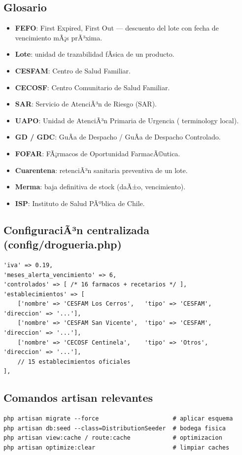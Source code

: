 ﻿\documentclass[a4paper, 12pt]{article}
\begin{document}
\subsection{Glosario}
\begin{itemize}
    \item \textbf{FEFO}: First Expired, First Out --- descuento del lote con fecha de vencimiento mÃ¡s prÃ³xima.
    \item \textbf{Lote}: unidad de trazabilidad fÃ­sica de un producto.
    \item \textbf{CESFAM}: Centro de Salud Familiar.
    \item \textbf{CECOSF}: Centro Comunitario de Salud Familiar.
    \item \textbf{SAR}: Servicio de AtenciÃ³n de Riesgo (SAR).
    \item \textbf{UAPO}: Unidad de AtenciÃ³n Primaria de Urgencia ( terminology local).
    \item \textbf{GD / GDC}: GuÃ­a de Despacho / GuÃ­a de Despacho Controlado.
    \item \textbf{FOFAR}: FÃ¡rmacos de Oportunidad FarmacÃ©utica.
    \item \textbf{Cuarentena}: retenciÃ³n sanitaria preventiva de un lote.
    \item \textbf{Merma}: baja definitiva de stock (daÃ±o, vencimiento).
    \item \textbf{ISP}: Instituto de Salud PÃºblica de Chile.
\end{itemize}

\subsection{ConfiguraciÃ³n centralizada (config/drogueria.php)}
\begin{lstlisting}
'iva' => 0.19,
'meses_alerta_vencimiento' => 6,
'controlados' => [ /* 16 farmacos + recetarios */ ],
'establecimientos' => [
    ['nombre' => 'CESFAM Los Cerros',   'tipo' => 'CESFAM', 'direccion' => '...'],
    ['nombre' => 'CESFAM San Vicente',  'tipo' => 'CESFAM', 'direccion' => '...'],
    ['nombre' => 'CECOSF Centinela',    'tipo' => 'Otros',  'direccion' => '...'],
    // 15 establecimientos oficiales
],
\end{lstlisting}

\subsection{Comandos artisan relevantes}
\begin{lstlisting}
php artisan migrate --force                     # aplicar esquema
php artisan db:seed --class=DistributionSeeder  # bodega fisica
php artisan view:cache / route:cache            # optimizacion
php artisan optimize:clear                      # limpiar caches
\end{lstlisting}
\end{document}
